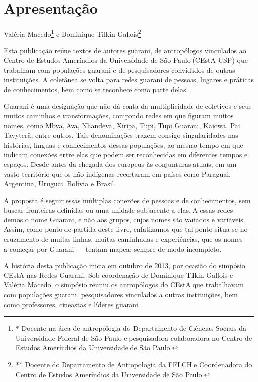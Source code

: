 \documentclass{article}
\title{}
\author{}
\date{2017-01-26T12:20:36.108195923}
\begin{document}
\section[Apresenta\c{c}\~ao]{Apresenta\c{c}\~ao}
Val\'eria Macedo\footnote{* Docente na \'area de antropologia
do~Departamento de Ci\^encias Sociais da Universidade Federal de S\~ao
Paulo e pesquisadora colaboradora no Centro de Estudos Amer\'indios da
Universidade de S\~ao Paulo.} e Dominique Tilkin Gallois\footnote{**
Docente do Departamento de Antropologia da FFLCH e Coordenadora do
Centro de Estudos Amer\'indios da Universidade de S\~ao Paulo.}

Esta publica\c{c}\~ao re\'une textos de autores guarani, de
antrop\'ologos vinculados ao Centro de Estudos Amer\'indios da
Universidade de S\~ao Paulo (CEstA-USP) que trabalham com
popula\c{c}\~oes guarani e de pesquisadores convidados de outras
institui\c{c}\~oes. A colet\^anea se volta para redes guarani de
pessoas, lugares e pr\'aticas de conhecimentos, bem como se reconhece
como parte delas. 

Guarani \'e uma designa\c{c}\~ao que n\~ao d\'a conta da multiplicidade
de coletivos e seus muitos caminhos e transforma\c{c}\~oes, compondo
redes em que figuram muitos nomes, como Mbya, Ava, Nhandeva, Xiripa,
Tupi, Tupi Guarani, Kaiowa, Pai Tavyter\~a, entre outros. Tais
denomina\c{c}\~oes trazem consigo singularidades nas hist\'orias,
l\'inguas e conhecimentos dessas popula\c{c}\~oes, ao mesmo tempo em
que indicam conex\~oes entre elas que podem ser reconhecidas em
diferentes tempos e espa\c{c}os. Desde antes da chegada dos europeus
\`as conjunturas atuais, em um vasto territ\'orio que os n\~ao
ind\'igenas recortaram em pa\'ises como Paraguai, Argentina, Uruguai,
Bol\'ivia e Brasil.

A proposta \'e seguir essas m\'ultiplas conex\~oes de pessoas e de
conhecimentos, sem buscar fronteiras definidas ou uma unidade
subjacente a elas. A essas redes demos o nome Guarani, e n\~ao aos
grupos, cujos nomes s\~ao variados e vari\'aveis. Assim, como ponto de
partida deste livro, enfatizamos que tal ponto situa-se no cruzamento
de muitas linhas, muitas caminhadas e experi\^encias, que os nomes ---
a come\c{c}ar por Guarani --- tentam mapear sempre de modo incompleto.

A hist\'oria desta publica\c{c}\~ao inicia em outubro de 2013, por
ocasi\~ao do simp\'osio CEstA nas Redes Guarani.  Sob coordena\c{c}\~ao
de Dominique Tilkin Gallois e Val\'eria Macedo, o simp\'osio reuniu os
antrop\'ologos do CEstA que trabalhavam com popula\c{c}\~oes guarani,
pesquisadores vinculados a outras institui\c{c}\~oes, bem como
professores, cineastas e l\'ideres guarani.
\end{document}

